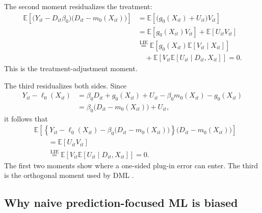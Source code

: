 \documentclass[11pt,oneside,a4paper]{book}
\begin{document}
The second moment residualizes the treatment:
\begin{align*}
\mathbb{E}\!\left[
\bigl(Y_{it}-D_{it}\beta_0\bigr)
\bigl(D_{it}-m_0(X_{it})\bigr)
\right]
&=
\mathbb{E}\!\left[
\bigl(g_0(X_{it})+U_{it}\bigr)V_{it}
\right] \\
&=
\mathbb{E}[g_0(X_{it})V_{it}]
+\mathbb{E}[U_{it}V_{it}] \\
&\overset{\mathrm{LIE}}{=}
\mathbb{E}\!\left[
g_0(X_{it})\mathbb{E}[V_{it}\mid X_{it}]
\right] \\
&\quad+
\mathbb{E}\!\left[
V_{it}\mathbb{E}[U_{it}\mid D_{it},X_{it}]
\right]
=0.
\end{align*}
This is the treatment-adjustment moment.

The third residualizes both sides. Since
\begin{align*}
Y_{it}-\ell_0(X_{it})
&=
\beta_0D_{it}+g_0(X_{it})+U_{it}
-\beta_0m_0(X_{it})-g_0(X_{it}) \\
&=
\beta_0\bigl(D_{it}-m_0(X_{it})\bigr)+U_{it},
\end{align*}
it follows that
\begin{align*}
&\mathbb{E}\!\left[
\left\{
Y_{it}-\ell_0(X_{it})
-\beta_0\bigl(D_{it}-m_0(X_{it})\bigr)
\right\}
\bigl(D_{it}-m_0(X_{it})\bigr)
\right] \\
&\qquad =
\mathbb{E}[U_{it}V_{it}] \\
&\qquad \overset{\mathrm{LIE}}{=}
\mathbb{E}\!\left[
V_{it}\mathbb{E}[U_{it}\mid D_{it},X_{it}]
\right]
=0.
\end{align*}
The first two moments show where a one-sided plug-in error can enter. The third is the orthogonal moment used by DML \citep{robinson1988rootn,chernozhukov2018dml}.

\subsection[Why Naive Prediction-Focused ML Is Biased]{Why naive prediction-focused ML is biased}
\end{document}
